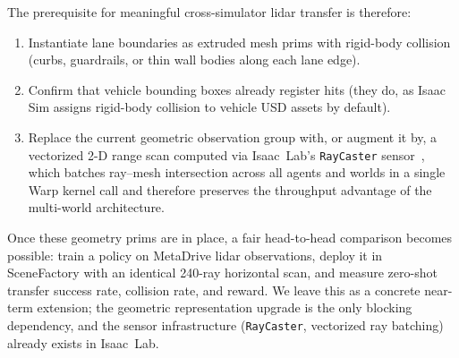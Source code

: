The prerequisite for meaningful cross-simulator lidar transfer is therefore:
\begin{enumerate}[leftmargin=*, itemsep=2pt]
  \item Instantiate lane boundaries as extruded mesh prims with rigid-body collision
        (curbs, guardrails, or thin wall bodies along each lane edge).
  \item Confirm that vehicle bounding boxes already register hits (they do, as Isaac
        Sim assigns rigid-body collision to vehicle USD assets by default).
  \item Replace the current geometric observation group with, or augment it by, a
        vectorized 2-D range scan computed via Isaac~Lab's \texttt{RayCaster}
        sensor~\cite{mittal_orbit_2023}, which batches ray--mesh intersection
        across all agents and worlds in a single Warp kernel call and therefore
        preserves the throughput advantage of the multi-world architecture.
\end{enumerate}
%
Once these geometry prims are in place, a fair head-to-head comparison becomes
possible: train a policy on MetaDrive lidar observations, deploy it in SceneFactory
with an identical 240-ray horizontal scan, and measure zero-shot transfer success
rate, collision rate, and reward.
%
We leave this as a concrete near-term extension; the geometric representation
upgrade is the only blocking dependency, and the sensor infrastructure
(\texttt{RayCaster}, vectorized ray batching) already exists in Isaac~Lab.
